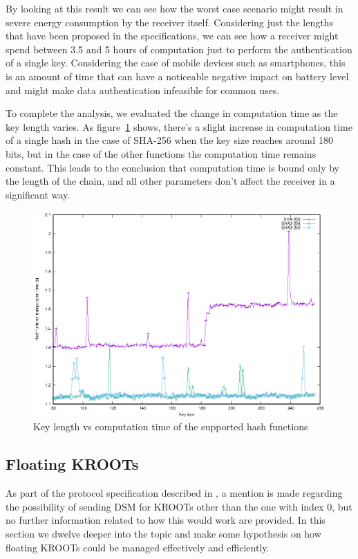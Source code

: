 By looking at this result we can see how the worst case scenario might result
in severe energy consumption by the receiver itself. Considering just the
lengths that have been proposed in the specifications, we can see how a receiver
might spend between 3.5 and 5 hours of computation just to perform the
authentication of a single key. Considering the case of mobile devices such as
smartphones, this is an amount of time that can have a noticeable negative
impact on battery level and might make data authentication infeasible for common
uses.

To complete the analysis, we evaluated the change in computation time as
the key length varies. As figure~\ref{fig:key_length} shows, there's a slight
increase in computation time of a single hash in the case of SHA-256 when the
key size reaches around 180 bits, but in the case of the other functions the
computation time remains constant. This leads to the conclusion that computation
time is bound only by the length of the chain, and all other parameters don't
affect the receiver in a significant way.

\begin{figure}[h!]
  \includegraphics[width=\linewidth]{figures/key_length.eps}
  \caption{Key length vs computation time of the supported hash functions}
  \label{fig:key_length}
\end{figure}

\subsection{Floating KROOTs}
As part of the protocol specification described in \cite{osnma}, a mention
is made regarding the possibility of sending DSM for KROOTs other than the one
with index $0$, but no further information related to how this would work are
provided. In this section we dwelve deeper into the topic and make some hypothesis
on how floating KROOTs could be managed effectively and efficiently.

